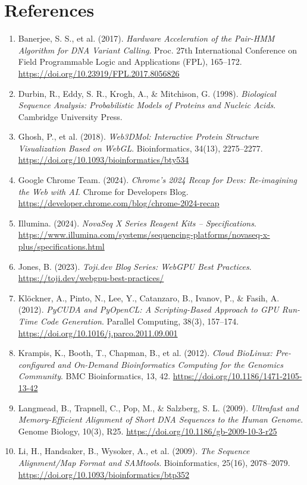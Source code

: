 \documentclass[PhD]{PHlab-thesis}
\begin{document}
\chapter{References}
\begin{enumerate}
    \item Banerjee, S. S., et al. (2017). \emph{Hardware Acceleration of the Pair-HMM Algorithm for DNA Variant Calling}. Proc. 27th International Conference on Field Programmable Logic and Applications (FPL), 165–172. \url{https://doi.org/10.23919/FPL.2017.8056826}
    \item Durbin, R., Eddy, S. R., Krogh, A., \& Mitchison, G. (1998). \emph{Biological Sequence Analysis: Probabilistic Models of Proteins and Nucleic Acids}. Cambridge University Press.
    \item Ghosh, P., et al. (2018). \emph{Web3DMol: Interactive Protein Structure Visualization Based on WebGL}. Bioinformatics, 34(13), 2275–2277. \url{https://doi.org/10.1093/bioinformatics/bty534}
    \item Google Chrome Team. (2024). \emph{Chrome’s 2024 Recap for Devs: Re-imagining the Web with AI}. Chrome for Developers Blog. \url{https://developer.chrome.com/blog/chrome-2024-recap}
    \item Illumina. (2024). \emph{NovaSeq X Series Reagent Kits – Specifications}. \url{https://www.illumina.com/systems/sequencing-platforms/novaseq-x-plus/specifications.html}
    \item Jones, B. (2023). \emph{Toji.dev Blog Series: WebGPU Best Practices}. \url{https://toji.dev/webgpu-best-practices/}
    \item Klöckner, A., Pinto, N., Lee, Y., Catanzaro, B., Ivanov, P., \& Fasih, A. (2012). \emph{PyCUDA and PyOpenCL: A Scripting-Based Approach to GPU Run-Time Code Generation}. Parallel Computing, 38(3), 157–174. \url{https://doi.org/10.1016/j.parco.2011.09.001}
    \item Krampis, K., Booth, T., Chapman, B., et al. (2012). \emph{Cloud BioLinux: Pre-configured and On-Demand Bioinformatics Computing for the Genomics Community}. BMC Bioinformatics, 13, 42. \url{https://doi.org/10.1186/1471-2105-13-42}
    \item Langmead, B., Trapnell, C., Pop, M., \& Salzberg, S. L. (2009). \emph{Ultrafast and Memory-Efficient Alignment of Short DNA Sequences to the Human Genome}. Genome Biology, 10(3), R25. \url{https://doi.org/10.1186/gb-2009-10-3-r25}
    \item Li, H., Handsaker, B., Wysoker, A., et al. (2009). \emph{The Sequence Alignment/Map Format and SAMtools}. Bioinformatics, 25(16), 2078–2079. \url{https://doi.org/10.1093/bioinformatics/btp352}

\end{enumerate}
\end{document}
